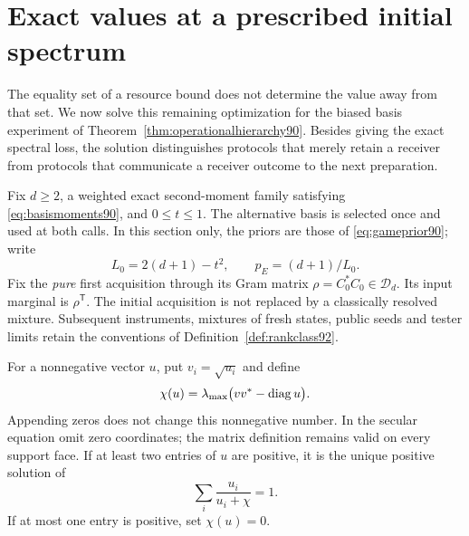 \section{Exact values at a prescribed initial spectrum}
\label{sec:spectralvalue94}
The equality set of a resource bound does not determine the value away
from that set.  We now solve this remaining optimization for the biased
basis experiment of Theorem~\ref{thm:operationalhierarchy90}.  Besides
giving the exact spectral loss, the solution distinguishes protocols
that merely retain a receiver from protocols that communicate a
receiver outcome to the next preparation.

Fix $d\ge2$, a weighted exact second-moment family satisfying
\eqref{eq:basismoments90}, and $0\le t\le1$.  The alternative basis is
selected once and used at both calls.  In this section only, the priors
are those of \eqref{eq:gameprior90}; write
\[
 L_0=2(d+1)-t^2,\qquad p_E=(d+1)/L_0.
\]
Fix the \emph{pure} first acquisition through its Gram matrix
$\rho=C_0^*C_0\in\mathcal D_d$.  Its input marginal is
$\rho^{\mathsf T}$.  The initial acquisition is not replaced by a
classically resolved mixture.  Subsequent instruments, mixtures of
fresh states, public seeds and tester limits retain the conventions of
Definition~\ref{def:rankclass92}.

For a nonnegative vector $u$, put $v_i=\sqrt{u_i}$ and define
\begin{equation}\label{eq:secularmatrix94}
 \chi(u)=\lambda_{\max}\bigl(vv^*-\operatorname{diag} u\bigr).
\end{equation}
Appending zeros does not change this nonnegative number.  In the secular
equation omit zero coordinates; the matrix definition remains valid on
every support face.  If at least
two entries of $u$ are positive, it is the unique positive solution of
\begin{equation}\label{eq:secularroot94}
                 \sum_i\frac{u_i}{u_i+\chi}=1.
\end{equation}
If at most one entry is positive, set $\chi(u)=0$.

